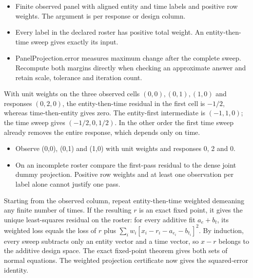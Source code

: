 \expandafter\def\csname statadic@assumptions@STATADIC-PANEL-004\endcsname{\begin{itemize}
\item Finite observed panel with aligned entity and time labels and positive row weights. The argument is per response or design column.
\item Every label in the declared roster has positive total weight. An entity-then-time sweep gives exactly its input.
\end{itemize}}
\expandafter\def\csname statadic@diagnostics@STATADIC-PANEL-004\endcsname{\begin{itemize}
\item PanelProjection.error measures maximum change after the complete sweep. Recompute both margins directly when checking an approximate answer and retain scale, tolerance and iteration count.
\end{itemize}}
\expandafter\def\csname statadic@statement@STATADIC-PANEL-005\endcsname{With unit weights on the three observed cells
  $(0,0),(0,1),(1,0)$ and responses $(0,2,0)$, the entity-then-time
  residual in the first cell is $-1/2$, whereas time-then-entity gives zero.}
\expandafter\def\csname statadic@proof@STATADIC-PANEL-005\endcsname{The entity-first intermediate is $(-1,1,0)$; the time sweep
  gives $(-1/2,0,1/2)$. In the other order the first time sweep already
  removes the entire response, which depends only on time.}
\expandafter\def\csname statadic@assumptions@STATADIC-PANEL-005\endcsname{\begin{itemize}
\item Observe (0,0), (0,1) and (1,0) with unit weights and responses 0, 2 and 0.
\end{itemize}}
\expandafter\def\csname statadic@diagnostics@STATADIC-PANEL-005\endcsname{\begin{itemize}
\item On an incomplete roster compare the first-pass residual to the dense joint dummy projection. Positive row weights and at least one observation per label alone cannot justify one pass.
\end{itemize}}
\expandafter\def\csname statadic@statement@STATADIC-PANEL-006\endcsname{Starting from the observed column, repeat entity-then-time
  weighted demeaning any finite number of times. If the resulting $r$ is an
  exact fixed point, it gives the unique least-squares residual on the roster:
  for every additive fit $a_e+b_t$, its weighted loss equals the loss of $r$
  plus $\sum_i w_i[x_i-r_i-a_{e_i}-b_{t_i}]^2$.}
\expandafter\def\csname statadic@proof@STATADIC-PANEL-006\endcsname{By induction, every sweep subtracts only an entity vector and
  a time vector, so $x-r$ belongs to the additive design space. The exact
  fixed-point theorem gives both sets of normal equations. The weighted
  projection certificate now gives the squared-error identity.}
